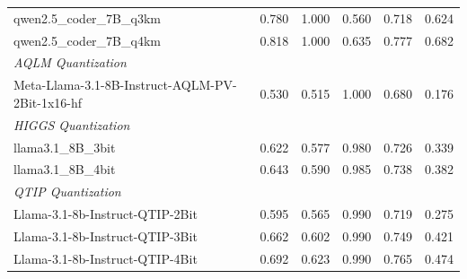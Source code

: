 \begin{table}[htbp]
{\begin{tabular}{lrrrrr}
    qwen2.5\_coder\_7B\_q3km & 0.780 & 1.000 & 0.560 & 0.718 & 0.624 \\
    qwen2.5\_coder\_7B\_q4km & 0.818 & 1.000 & 0.635 & 0.777 & 0.682 \\
    \midrule
    \multicolumn{6}{l}{\textit{AQLM Quantization}} \\
    \midrule
    Meta-Llama-3.1-8B-Instruct-AQLM-PV-2Bit-1x16-hf & 0.530 & 0.515 & 1.000 & 0.680 & 0.176 \\
    \midrule
    \multicolumn{6}{l}{\textit{HIGGS Quantization}} \\
    \midrule
    llama3.1\_8B\_3bit & 0.622 & 0.577 & 0.980 & 0.726 & 0.339 \\
    llama3.1\_8B\_4bit & 0.643 & 0.590 & 0.985 & 0.738 & 0.382 \\
    \midrule
    \multicolumn{6}{l}{\textit{QTIP Quantization}} \\
    \midrule
    Llama-3.1-8b-Instruct-QTIP-2Bit & 0.595 & 0.565 & 0.990 & 0.719 & 0.275 \\
    Llama-3.1-8b-Instruct-QTIP-3Bit & 0.662 & 0.602 & 0.990 & 0.749 & 0.421 \\
    Llama-3.1-8b-Instruct-QTIP-4Bit & 0.692 & 0.623 & 0.990 & 0.765 & 0.474 \\
    \bottomrule
  \end{tabular}
  }
\end{table}

